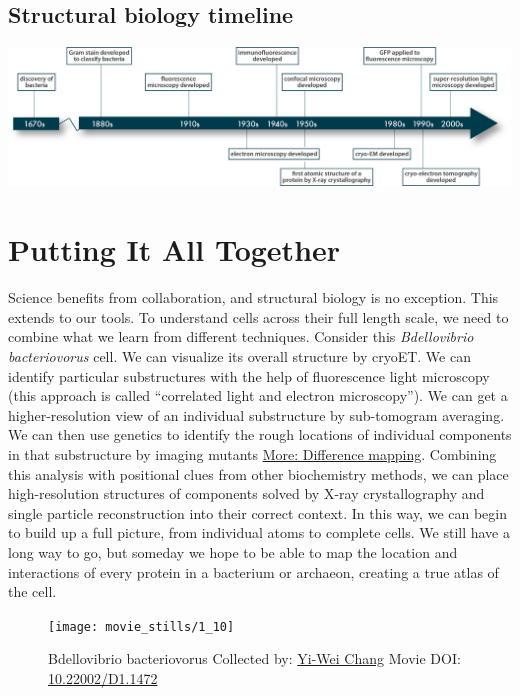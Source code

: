 \documentclass[]{tufte-book}
\begin{document}
\subsection{Structural biology
timeline}\label{Structural_biology_timeline}

\includegraphics{img/schematics/1_9_1}

\section{Putting It All Together}\label{putting-it-all-together}

Science benefits from collaboration, and structural biology is no
exception. This extends to our tools. To understand cells across their
full length scale, we need to combine what we learn from different
techniques. Consider this \emph{Bdellovibrio bacteriovorus} cell. We can
visualize its overall structure by cryoET. We can identify particular
substructures with the help of fluorescence light microscopy (this
approach is called ``correlated light and electron microscopy''). We can
get a higher-resolution view of an individual substructure by
sub-tomogram averaging. We can then use genetics to identify the rough
locations of individual components in that substructure by imaging
mutants \protect\hyperlink{Difference_mapping}{More: Difference
mapping}. Combining this analysis with positional clues from other
biochemistry methods, we can place high-resolution structures of
components solved by X-ray crystallography and single particle
reconstruction into their correct context. In this way, we can begin to
build up a full picture, from individual atoms to complete cells. We
still have a long way to go, but someday we hope to be able to map the
location and interactions of every protein in a bacterium or archaeon,
creating a true atlas of the cell.





\begin{figure}
\texttt{[image: movie\_stills/1\_10]} \caption[Bdellovibrio bacteriovorus Collected by:
\protect\hyperlink{yi-wei_chang}{Yi-Wei Chang} Movie DOI:
\href{https://doi.org/10.22002/D1.1472}{10.22002/D1.1472}]{Bdellovibrio bacteriovorus Collected by:
\protect\hyperlink{yi-wei_chang}{Yi-Wei Chang} Movie DOI:
\href{https://doi.org/10.22002/D1.1472}{10.22002/D1.1472}}\label{fig:1-10}
\end{figure}
\end{document}
